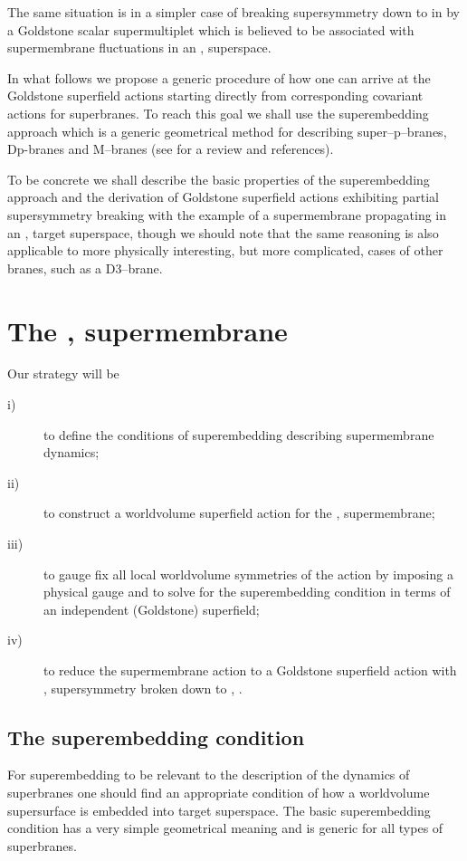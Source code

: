 \documentclass[a4paper,12pt]{article}
\begin{document}
The same situation is in a simpler case of breaking \coordHE{}
supersymmetry down to \coordHE{} in \coordHE{} by a Goldstone scalar
supermultiplet \cite{ik1} which is believed to be associated with
supermembrane fluctuations in an \coordHE{}, \coordHE{} superspace.

In what follows we propose a generic procedure of how one can
arrive at the Goldstone superfield actions starting directly from
corresponding covariant actions for superbranes. To reach this
goal we shall use the superembedding approach  which is a generic
geometrical method for describing super--p--branes, Dp-branes and
M--branes (see \cite{s} for a review and references).

To be concrete we shall describe the basic properties of the
superembedding approach and the derivation of Goldstone
superfield actions exhibiting partial supersymmetry breaking with
the example of a supermembrane propagating in an \coordHE{}, \coordHE{}
target superspace, though we should note that the same reasoning
is also applicable to more physically interesting, but more
complicated, cases of other branes, such as a D3--brane.

\section{The \coordHE{}, \coordHE{} supermembrane}
Our strategy will be
\begin{description}
\item[i)]
to define the conditions of superembedding describing
supermembrane dynamics;
\item[ii)]
to construct a worldvolume superfield action for the \coordHE{}, \coordHE{}
supermembrane;
\item[iii)]
to gauge fix all local worldvolume symmetries of the action by
imposing a physical gauge and to solve for the superembedding
condition in terms of an independent (Goldstone) superfield;
\item[iv)]
to reduce the supermembrane action to a Goldstone superfield
action with \coordHE{}, \coordHE{} supersymmetry broken down to \coordHE{},
\coordHE{}.
\end{description}

\subsection{The superembedding condition}
For superembedding to be relevant to the description of the
dynamics of superbranes one should find an appropriate condition
of how a worldvolume supersurface is embedded into target
superspace. The basic superembedding condition has a very simple
geometrical meaning and is generic for all types of superbranes.
\end{document}
